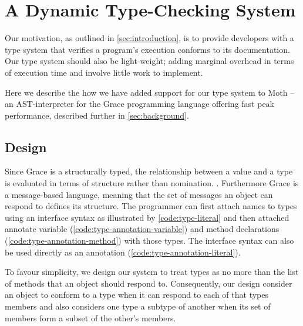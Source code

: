 
\section{A Dynamic Type-Checking System}
\label{sec:method}


Our motivation, as outlined in \cref{sec:introduction}, is to provide developers with
a type system that verifies a program's execution conforms to its documentation. 
Our type system should also be light-weight; 
adding marginal overhead in terms of execution time and
involve little work to implement.

Here we describe the how we have added support for our type system to Moth --
an AST-interpreter for the Grace programming language offering fast peak performance,
described further in \cref{sec:background}. 






\subsection{Design}



Since Grace is a structurally typed, 
the relationship between a value and a type is evaluated in terms of structure rather than nomination.
.
Furthermore Grace is a message-based language,
meaning that the set of messages an object can respond to defines its structure.
The programmer can first attach names to types using an interface syntax as illustrated by \cref{code:type-literal}
and then attached annotate variable (\cref{code:type-annotation-variable})
and method declarations (\cref{code:type-annotation-method})
with those types. 
The interface syntax can also be used directly as an annotation (\ref{code:type-annotation-literal}).

To favour simplicity,
we design our system to treat types as no more than the list of methods that an object should respond to.
Consequently, our design consider an object to 
conform to a type when it can respond to each of that types members and
also considers one type a subtype of another 
when its set of members form a subset of the other's members.

